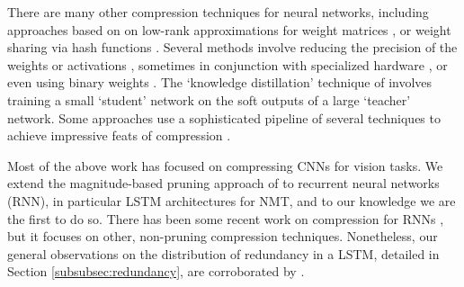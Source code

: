 There are many other compression techniques for neural networks, including approaches based on on low-rank approximations for weight matrices \cite{jaderberg2014speeding,denton2014exploiting}, or weight sharing  via hash functions \cite{chen2015compressing}.
Several methods involve reducing the precision of the weights or activations \cite{courbariaux2014low}, sometimes in conjunction with specialized hardware \cite{gupta2015deep}, or even using binary weights \cite{lin2015neural}.
The `knowledge distillation' technique of \cite{hinton2015distilling} involves training a small `student' network on the soft outputs of a large `teacher' network.
Some approaches use a sophisticated pipeline of several techniques to achieve impressive feats of compression \cite{han2015deep,iandola2016squeezenet}.

Most of the above work has focused on compressing CNNs for vision tasks. 
We extend the magnitude-based pruning approach of \cite{han2015learning} to recurrent neural networks (RNN), in particular LSTM architectures for NMT, and to our knowledge we are the first to do so.
There has been some recent work on compression for RNNs \cite{lu2016learning,prabhavalkar2016compression}, but it focuses on other, non-pruning compression techniques. 
Nonetheless, our general observations on the distribution of redundancy in a
LSTM, detailed in Section \ref{subsubsec:redundancy}, are corroborated by \cite{lu2016learning}.


